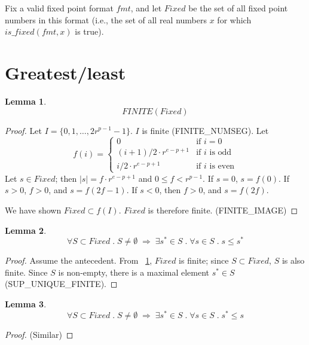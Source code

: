 \documentclass{article}
\begin{document}
\theoremstyle{definition}
\newtheorem{thm}{Theorem}[section]
\newtheorem{lem}[thm]{Lemma}

Fix a valid fixed point format $fmt$, and let $Fixed$ be the set of all 
fixed point numbers in this format (i.e., the set of all real numbers $x$ for 
which $is\_fixed(fmt,x)$ is true).

\section{Greatest/least}

\begin{lem}
\label{fixedfinite}
\begin{equation*}
FINITE(Fixed)
\end{equation*}
\begin{proof} Let $I = \{0, 1, \ldots, 2r^{p - 1} - 1\}$. $I$ is finite 
(FINITE\_NUMSEG). Let
\begin{equation*}
f(i) = \left \{
\begin{array}{ll}
0 & \text{if $i = 0$}\\
(i + 1)/2 \cdot r^{e - p + 1} & \text{if $i$ is odd}\\
i/2 \cdot r^{e - p + 1} & \text{if $i$ is even}
\end{array} \right .
\end{equation*}
Let $s \in Fixed$; then $|s| = f \cdot r^{e - p + 1}$ and $0 \leq f < r^{p - 1}$.
If $s = 0$, $s = f(0)$. If $s > 0$, $f > 0$, and $s = f(2f - 1)$. If $s < 0$,
then $f > 0$, and $s = f(2f)$.

We have shown $Fixed \subset f(I)$. $Fixed$ is therefore finite. (FINITE\_IMAGE)
\end{proof}
\end{lem}

\begin{lem}
\label{greatestexists}
\begin{equation*}
\forall S \subset Fixed \; . \; S \neq \emptyset \;
\Longrightarrow \; \exists s^* \in S \; . \; \forall s \in S \; . \;
s \leq s^*
\end{equation*}
\begin{proof} Assume the antecedent. From ~\ref{fixedfinite}, $Fixed$ is
finite; since $S \subset Fixed$, $S$ is also finite. Since $S$ is non-empty,
there is a maximal element $s^* \in S$\\
(SUP\_UNIQUE\_FINITE).
\end{proof}
\end{lem}

\begin{lem}
\label{leastexists}
\begin{equation*}
\forall S \subset Fixed \; . \; S \neq \emptyset \;
\Longrightarrow \; \exists s^* \in S \; . \; \forall s \in S \; . \;
s^* \leq s
\end{equation*}
\begin{proof} (Similar)
\end{proof}
\end{lem}
\end{document}

